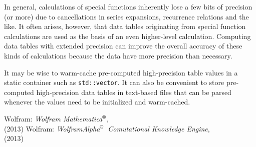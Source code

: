 \documentclass{article}[10pt]
\def\trademarksymbolr   {$^{\text{\rm{\scriptsize{\textregistered}}}}$}
\def\mathematica        {{Mathematica\trademarksymbolr}}
\def\wolframalpha       {{WolframAlpha\trademarksymbolr}}
\begin{document}
In general, calculations of special functions inherently
lose a few bits of precision (or more)
due to cancellations in series expansions,
recurrence relations and the like. It often arises, however,
that data tables originating from
special function calculations are used as the basis
of an even higher-level calculation. Computing data tables
with extended precision can improve the overall accuracy of
these kinds of calculations because the data have
more precision than necessary.

It may be wise to warm-cache pre-computed high-precision
table values in a static container such as \lstinline|std::vector|.
It can also be convenient to store pre-computed high-precision
data tables in text-based files that can be parsed whenever
the values need to be initialized and warm-cached.

\begin{thebibliography}{9}
Wolfram: {\textit{Wolfram \mathematica}},\\
{} (2013)
Wolfram: {\textit{\wolframalpha\ Comutational Knowledge Engine}},\\
{} (2013)
\end{thebibliography}
\end{document}
